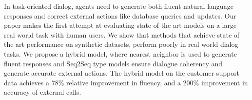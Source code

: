 In task-oriented dialog, agents need to generate both fluent natural language responses and correct external actions like database queries and updates. Our paper makes the first attempt at evaluating state of the art models on a large real world task with human users. We show that methods that achieve state of the art performance on synthetic datasets, perform poorly in real world dialog tasks. We propose a hybrid model, where nearest neighbor is used to generate fluent responses and Seq2Seq type models ensure dialogue coherency and generate accurate external actions. The hybrid model on the customer support data achieves a 78\% relative improvement in fluency, and a 200\% improvement in accuracy of external calls.
